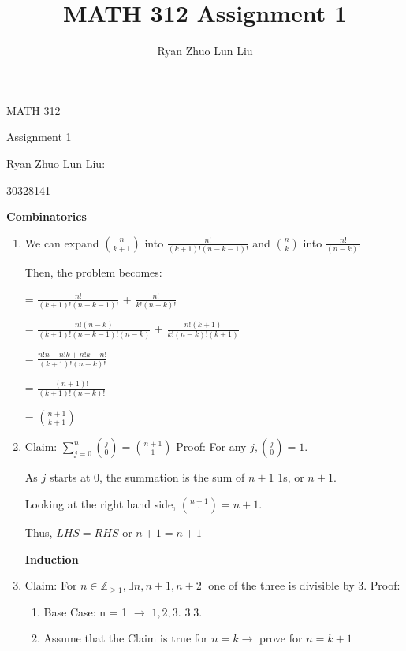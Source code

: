 \documentclass{amsart}
\author{Ryan Zhuo Lun Liu}
\title{MATH 312 Assignment 1}
\begin{document}
\begin{center}
{\huge MATH 312 \par}
{\Large Assignment 1 \par}
{\normalsize Ryan Zhuo Lun Liu: \par}
{\normalsize 30328141 \par}

\end{center}

\centerline{\textbf{Combinatorics}}
\begin{enumerate}
  \item
  \begin{flushleft}
  We can expand $\binom{n}{k+1}$ into $\frac{n!}{(k+1)!(n-k-1)!}$ and $\binom{n}{k}$ into $\frac{n!}{(n-k)!}$

  Then, the problem becomes:

  = $\frac{n!}{(k+1)!(n-k-1)!}$ + $\frac{n!}{k!(n-k)!}$

  = $\frac{n!(n-k)}{(k+1)!(n-k-1)!(n-k)}$ + $\frac{n!(k+1)}{k!(n-k)!(k+1)}$

  = $\frac{n!n - n!k + n!k + n!}{(k+1)!(n-k)!}$

  = $\frac{(n+1)!}{(k+1)!(n-k)!}$

  = $\binom{n+1}{k+1}$
  \newline
  \end{flushleft}

  \item
  \begin{flushleft}
  Claim: $\sum_{j=0}^{n}\binom{j}{0} = \binom{n+1}{1}$
  Proof:
  For any $j, \binom{j}{0} = 1$.

  As $j$ starts at 0, the summation is the sum of $n + 1$ 1s, or $n + 1$.

  Looking at the right hand side, $\binom{n+1}{1} = n + 1$.

  Thus, $LHS = RHS$ or $n + 1 = n + 1$
  \newline
  \end{flushleft}

\centerline{\textbf{Induction}}
  \item
  \begin{flushleft}
  Claim: For $n \in \mathbb{Z}_{\geq 1}, \exists n, n+1, n+2 |$ one of the three is divisible by 3.
  Proof:
  \begin{enumerate}
    \item Base Case: n = 1 $\rightarrow$ $1, 2, 3$. $3 | 3$.

    \item Assume that the Claim is true for $n = k \rightarrow$ prove for $n = k + 1$


\end{enumerate}
\end{flushleft}
\end{enumerate}
\end{document}
